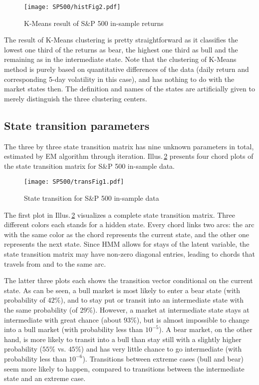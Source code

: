         \begin{figure}[!hbt]
        \center
        \texttt{[image: SP500/histFig2.pdf]}
        \caption{K-Means result of S\&P 500 in-sample returns}
        \label{fig:SP:KMeans}
        \end{figure}
The result of K-Means clustering is pretty straightforward 
as it classifies the lowest one third of the returns as bear,
the highest one third as bull and the remaining as in the intermediate state.
Note that the clustering of K-Means method is purely based on quantitative differences of the data
(daily return and corresponding 5-day volatility in this case),
and has nothing to do with the market states then.
The definition and names of the states are artificially given to 
merely distinguish the three clustering centers.


\subsection{State transition parameters}
\label{sec:positive:SP:transition}
The three by three state transition matrix has nine unknown parameters in total,
estimated by EM algorithm through iteration.
Illus.\,\ref{fig:SP:transition} presents four chord plots
of the state transition matrix for S\&P 500 in-sample data.

        \begin{figure}[!hbt]
        \center
        \texttt{[image: SP500/transFig1.pdf]}
        \caption{State transition for S\&P 500 in-sample data}
        \label{fig:SP:transition}
        \end{figure}
The first plot in Illus.\,\ref{fig:SP:transition} visualizes a complete state transition matrix.
Three different colors each stands for a hidden state.
Every chord links two arcs:
the arc with the same color as the chord represents the current state,
and the other one represents the next state.
Since HMM allows for stays of the latent variable,
the state transition matrix may have non-zero diagonal entries,
leading to chords that travels from and to the same arc.

The latter three plots each shows the transition vector conditional on the current state.
As can be seen, a bull market is most likely to enter a bear state (with probability of $42\%$),
and to stay put or transit into an intermediate state with the same probability (of $29$\%).
However, a market at intermediate state stays at intermediate with great chance (about $93\%$),
but is almost impossible to change into a bull market (with probability less than $10^{-5}$).
A bear market, on the other hand, is more likely to transit into a bull than stay still 
with a slightly higher probability ($55\%$ vs. $45\%$) 
and has very little chance to go intermediate (with probability less than $10^{-6}$).
Transitions between extreme cases (bull and bear) seem more likely to happen,
compared to transitions between the intermediate state and an extreme case.

